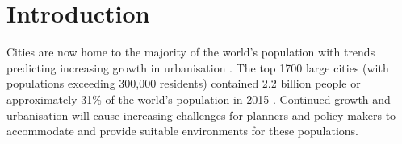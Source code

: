 \documentclass[10pt,letterpaper,hidelinks]{article}
\begin{document}



\linenumbers



\section*{Introduction}\label{sec:introduction}

Cities are now home to the majority of the world's population with trends predicting increasing growth in urbanisation \cite{UNDESA2015,WHO2016,ABS2008}. The top 1700 large cities (with populations exceeding 300,000 residents) contained 2.2 billion people or approximately 31\% of the world's population in 2015 \cite{UN2014}. Continued growth and urbanisation will cause increasing challenges for planners and policy makers to accommodate and provide suitable environments for these populations.
\end{document}
